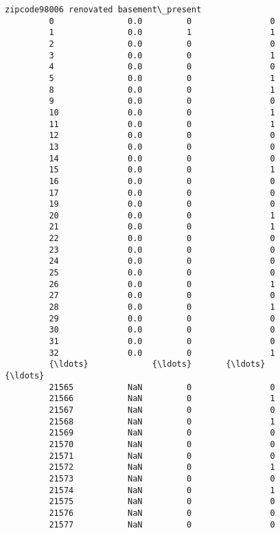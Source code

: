 \documentclass[11pt]{article}
\begin{document}
\begin{Verbatim}[commandchars=\\\{\}]
                zipcode98006 renovated basement\_present  
         0               0.0         0                0  
         1               0.0         1                1  
         2               0.0         0                0  
         3               0.0         0                1  
         4               0.0         0                0  
         5               0.0         0                1  
         8               0.0         0                1  
         9               0.0         0                0  
         10              0.0         0                1  
         11              0.0         0                1  
         12              0.0         0                0  
         13              0.0         0                0  
         14              0.0         0                0  
         15              0.0         0                1  
         16              0.0         0                0  
         17              0.0         0                0  
         19              0.0         0                0  
         20              0.0         0                1  
         21              0.0         0                1  
         22              0.0         0                0  
         23              0.0         0                0  
         24              0.0         0                0  
         25              0.0         0                0  
         26              0.0         0                1  
         27              0.0         0                0  
         28              0.0         0                1  
         29              0.0         0                0  
         30              0.0         0                0  
         31              0.0         0                0  
         32              0.0         0                1  
         {\ldots}             {\ldots}       {\ldots}              {\ldots}  
         21565           NaN         0                0  
         21566           NaN         0                1  
         21567           NaN         0                0  
         21568           NaN         0                1  
         21569           NaN         0                0  
         21570           NaN         0                0  
         21571           NaN         0                0  
         21572           NaN         0                1  
         21573           NaN         0                0  
         21574           NaN         0                1  
         21575           NaN         0                0  
         21576           NaN         0                0  
         21577           NaN         0                0  

\end{Verbatim}
\end{document}
